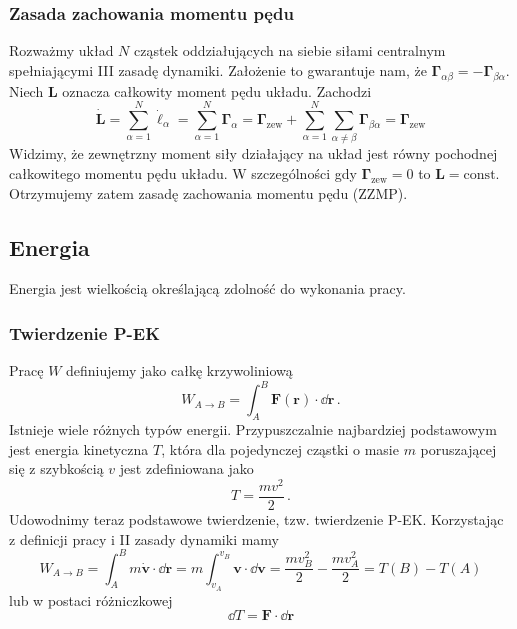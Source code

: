 \documentclass[../main.tex]{subfiles}
\begin{document}
\subsubsection{Zasada zachowania momentu pędu}
Rozważmy układ \(N\) cząstek oddziałujących na siebie siłami centralnym spełniającymi III zasadę dynamiki. Założenie to gwarantuje nam, że \(\boldsymbol{\Gamma}_{\alpha\beta}=-\boldsymbol{\Gamma}_{\beta\alpha}\). Niech \(\mathbf{L}\) oznacza całkowity moment pędu układu. Zachodzi
\begin{equation*}
    \dot{\mathbf{L}}=\sum_{\alpha=1}^N\dot{\boldsymbol{\ell}}_\alpha=\sum_{\alpha=1}^N\boldsymbol{\Gamma}_\alpha=\boldsymbol{\Gamma}_\text{zew}+\sum_{\alpha=1}^N\sum_{\alpha\neq\beta}\boldsymbol{\Gamma}_{\beta\alpha}=\boldsymbol{\Gamma}_\text{zew}
\end{equation*}
Widzimy, że zewnętrzny moment siły działający na układ jest równy pochodnej całkowitego momentu pędu układu. W szczególności gdy \(\boldsymbol{\Gamma}_\text{zew}=0\) to \(\mathbf{L}=\text{const}\). Otrzymujemy zatem zasadę zachowania momentu pędu (ZZMP).
\medskip

\noindent{}

\subsection{Energia}
Energia jest wielkością określającą zdolność do wykonania pracy.
\subsubsection{Twierdzenie P-EK}
Pracę \(W\) definiujemy jako całkę krzywoliniową
\begin{equation*}
    W_{A\rightarrow B}=\int_{A}^B\mathbf{F}(\mathbf{r})\cdot \dd\mathbf{r}\,.
\end{equation*}
Istnieje wiele różnych typów energii. Przypuszczalnie najbardziej podstawowym jest energia kinetyczna \(T\), która dla pojedynczej cząstki o masie \(m\) poruszającej się z szybkością \(v\) jest zdefiniowana jako
\begin{equation*}
    T=\frac{mv^2}{2}\,.
\end{equation*}
Udowodnimy teraz podstawowe twierdzenie, tzw. twierdzenie P-EK. Korzystając z definicji pracy i II zasady dynamiki mamy
\begin{equation*}
    W_{A\rightarrow B}=\int_{A}^Bm\dot{\mathbf{v}}\cdot \dd\mathbf{r}=m\int_{v_A}^{v_B}\mathbf{v}\cdot \dd\mathbf{v}=\frac{mv_B^2}{2}-\frac{mv_A^2}{2}=T(B)-T(A)
\end{equation*}
lub w postaci różniczkowej
\begin{equation*}
    \dd T=\mathbf{F}\cdot \dd\mathbf{r}
\end{equation*}
\end{document}
